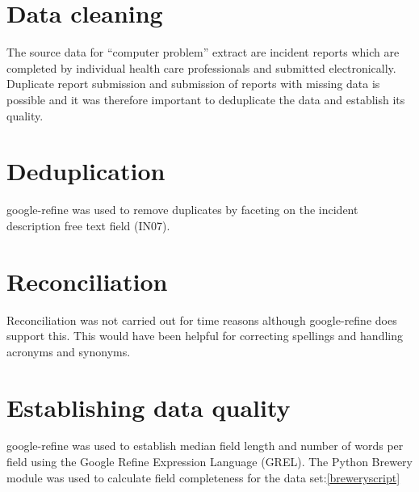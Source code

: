 \section{Data cleaning}

The source data for ``computer problem'' extract are incident reports which are completed by individual health care professionals and submitted electronically. Duplicate report submission and submission of reports with missing data is possible and it was therefore important to deduplicate the data and establish its quality.

\section{Deduplication}
google-refine\cite{huynhgoogle} was used to remove duplicates by faceting on the incident description free text field (IN07). 

\section{Reconciliation}
Reconciliation was not carried out for time reasons although google-refine\cite{huynhgoogle} does support this. This would have been helpful for correcting spellings and handling acronyms and synonyms.

\section{Establishing data quality}
google-refine\cite{huynhgoogle} was used to establish median field length and number of words per field using the Google Refine Expression Language (GREL). The Python Brewery\cite{pythonbrewery} module was used to calculate field completeness for the data set:\ref{breweryscript}

%


